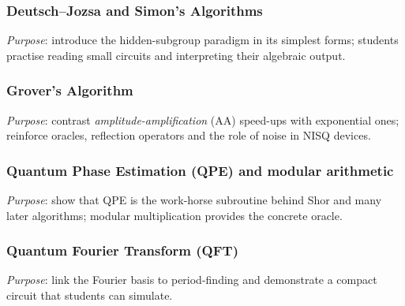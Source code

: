 \subsubsection{Deutsch–Jozsa and Simon's Algorithms}

\emph{Purpose}: introduce the hidden-subgroup paradigm in its simplest forms; 
students practise reading small circuits and interpreting their algebraic output.


\subsubsection{Grover's Algorithm}

\emph{Purpose}: contrast \emph{amplitude-amplification} (AA) speed-ups with exponential ones; 
reinforce oracles, reflection operators and the role of noise in NISQ devices.



\subsubsection{Quantum Phase Estimation (QPE) and modular arithmetic}

\emph{Purpose}: show that QPE is the work-horse subroutine behind Shor and many later algorithms; 
modular multiplication provides the concrete oracle.


\subsubsection{Quantum Fourier Transform (QFT)}

\emph{Purpose}: link the Fourier basis to period-finding 
and demonstrate a compact circuit that students can simulate.

